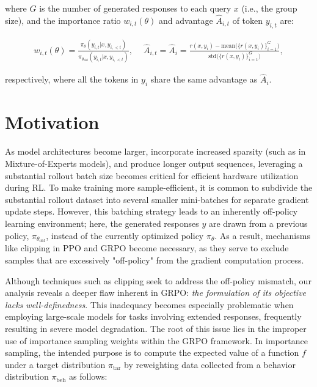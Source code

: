where $G$ is the number of generated responses to each query $x$ (i.e., the group size), and the importance ratio $w_{i,t}(\theta)$ and advantage $\widehat{A}_{i,t}$ of token $y_{i,t}$ are:

\begin{align}
    w_{i,t}(\theta)=\frac{ \pi_{\theta} (y_{i,t} | x, y_{i,<t}) }{ \pi_{\theta_\text{old}} (y_{i,t} | x, y_{i,<t}) },\quad\
    \widehat{A}_{i,t} = \widehat{A}_{i} = \frac{ r(x, y_i) - \mathrm{mean} \big( \{ r(x, y_i) \}_{i=1}^G \big) }{ \mathrm{std} \big( \{ r(x, y_i) \}_{i=1}^G \big) },
\end{align}

respectively, where all the tokens in $y_i$ share the same advantage as $\widehat{A}_{i}$.

\section{Motivation}
\label{sec:motivation}

As model architectures become larger, incorporate increased sparsity (such as in Mixture-of-Experts models), and produce longer output sequences, leveraging a substantial rollout batch size becomes critical for efficient hardware utilization during RL. To make training more sample-efficient, it is common to subdivide the substantial rollout dataset into several smaller mini-batches for separate gradient update steps. However, this batching strategy leads to an inherently off-policy learning environment; here, the generated responses $y$ are drawn from a previous policy, $\pi_{\theta_\text{old}}$, instead of the currently optimized policy $\pi_\theta$. As a result, mechanisms like clipping in PPO and GRPO become necessary, as they serve to exclude samples that are excessively "off-policy" from the gradient computation process.

Although techniques such as clipping seek to address the off-policy mismatch, our analysis reveals a deeper flaw inherent in GRPO: \textit{the formulation of its objective lacks well-definedness}. This inadequacy becomes especially problematic when employing large-scale models for tasks involving extended responses, frequently resulting in severe model degradation. The root of this issue lies in the improper use of importance sampling weights within the GRPO framework. In importance sampling, the intended purpose is to compute the expected value of a function $f$ under a target distribution $\pi_\text{tar}$ by reweighting data collected from a behavior distribution $\pi_\text{beh}$ as follows:

